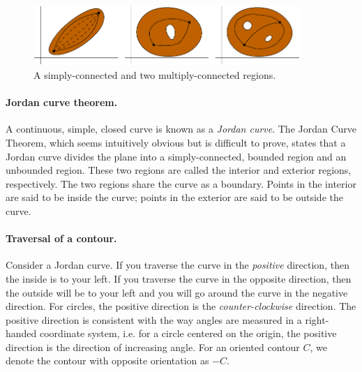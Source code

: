 \begin{figure}[htb!]
  \begin{center}
      \includegraphics[width=0.9\textwidth]{fcv/function/regions}
  \end{center}
  \caption{A simply-connected and two multiply-connected regions.}
  \label{regions}
\end{figure}





\paragraph{Jordan curve theorem.}
A continuous, simple, closed curve is known as a \textit{Jordan curve}.
The Jordan Curve Theorem, which seems intuitively obvious but is difficult
to prove, states that a Jordan curve divides the plane into a simply-connected,
bounded region and an unbounded region.  These two regions are called the
interior and exterior regions, respectively.  The two regions share the
curve as a boundary.  Points in the interior are said to be inside
the curve; points in the exterior are said to be outside the curve.







\paragraph{Traversal of a contour.}
Consider a Jordan curve.  If you traverse the curve in the
\textit{positive} direction, then the inside is to your left.  If you traverse%
the curve in the opposite direction, then the outside will be to your
left and you will go around the curve in the negative direction.
For circles, the positive direction is the
\textit{counter-clockwise} direction.   The positive direction is
consistent with the way angles are measured in a right-handed coordinate
system,  i.e. for a circle centered on the origin, the positive direction
is the direction of increasing angle.  For an oriented contour $C$,
we denote the contour with opposite orientation as $-C$.



